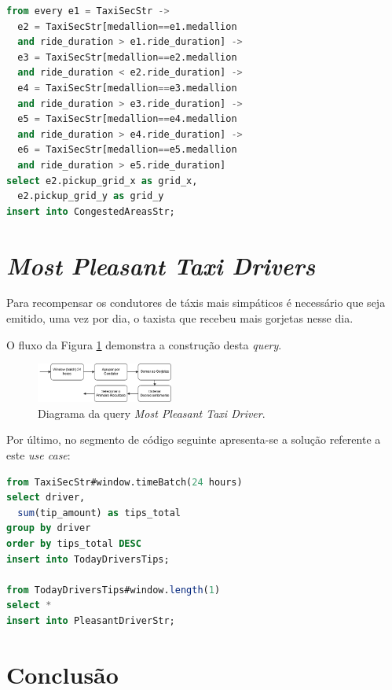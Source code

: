 \documentclass[article]{IEEEtran}
\begin{document}
\begin{lstlisting}[language=SQL]
from every e1 = TaxiSecStr ->
  e2 = TaxiSecStr[medallion==e1.medallion
  and ride_duration > e1.ride_duration] ->
  e3 = TaxiSecStr[medallion==e2.medallion
  and ride_duration < e2.ride_duration] ->
  e4 = TaxiSecStr[medallion==e3.medallion
  and ride_duration > e3.ride_duration] ->
  e5 = TaxiSecStr[medallion==e4.medallion
  and ride_duration > e4.ride_duration] ->
  e6 = TaxiSecStr[medallion==e5.medallion
  and ride_duration > e5.ride_duration]
select e2.pickup_grid_x as grid_x,
  e2.pickup_grid_y as grid_y
insert into CongestedAreasStr;
\end{lstlisting}



\section{\textit{Most Pleasant Taxi Drivers}}

Para recompensar os condutores de táxis mais simpáticos é necessário que seja emitido, uma vez por dia, o taxista que recebeu mais gorjetas nesse dia.

O fluxo da Figura \ref{fig:pleasantDriverDiagram} demonstra a construção desta \textit{query}.

\begin{figure}[hbtp]
    \centering
        \includegraphics[width=0.4\textwidth]{images/pleasantDriver}
    \caption{Diagrama da query \textit{Most Pleasant Taxi Driver}.}
    \label{fig:pleasantDriverDiagram}
\end{figure}

Por último, no segmento de código seguinte apresenta-se a solução referente a este \textit{use case}:

\begin{lstlisting}[language=SQL]
from TaxiSecStr#window.timeBatch(24 hours)
select driver, 
  sum(tip_amount) as tips_total
group by driver
order by tips_total DESC
insert into TodayDriversTips;

from TodayDriversTips#window.length(1)
select *
insert into PleasantDriverStr;
\end{lstlisting}

\section{Conclusão} 





\end{document}
